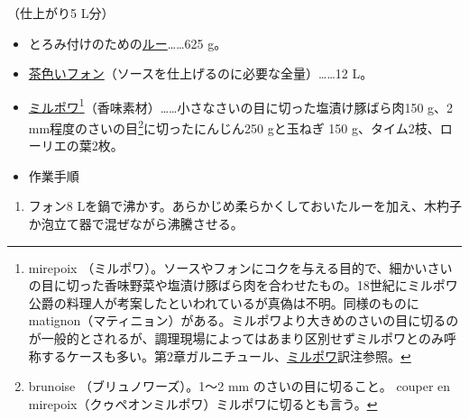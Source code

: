 \begin{recette}
\begin{frsubenv}
\end{frsubenv}

 

（仕上がり5 L分）

\begin{itemize}
\item
  とろみ付けのための\protect\hyperlink{roux-brun}{ルー}\ldots{}\ldots{}625
  g。
\item
  \protect\hyperlink{fonds-brun}{茶色いフォン}（ソースを仕上げるのに必要な全量）\ldots{}\ldots{}12
  L。
\item
  \protect\hyperlink{mirepoix}{ミルポワ}\footnote{mirepoix
    （ミルポワ）。ソースやフォンにコクを与える目的で、細かいさいの目に切った香味野菜や塩漬け豚ばら肉を合わせたもの。18世紀にミルポワ公爵の料理人が考案したといわれているが真偽は不明。同様のものにmatignon（マティニョン）がある。ミルポワより大きめのさいの目に切るのが一般的とされるが、調理現場によってはあまり区別せずミルポワとのみ呼称するケースも多い。第2章ガルニチュール、\protect\hyperlink{mirepoix}{ミルポワ}訳注参照。}（香味素材）\ldots{}\ldots{}小さなさいの目に切った塩漬け豚ばら肉150
  g、2 mm程度のさいの目\footnote{brunoise （ブリュノワーズ）。1〜2 mm
    のさいの目に切ること。 couper en
    mirepoix（クゥペオンミルポワ）ミルポワに切るとも言う。}に切ったにんじん250
  gと玉ねぎ 150
  g、タイム2枝、ローリエの葉2枚。
\item
  作業手順
\end{itemize}

\begin{enumerate}
\def\labelenumi{\arabic{enumi}.}
\item
  フォン8
  Lを鍋で沸かす。あらかじめ柔らかくしておいたルーを加え、木杓子か泡立て器で混ぜながら沸騰させる。


\end{enumerate}
\end{recette}
